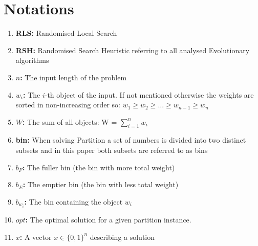 \section{Notations}
\begin{enumerate}
    \item \textbf{RLS:} Randomised Local Search
    \item \textbf{RSH:} Randomised Search Heuristic referring to all analysed Evolutionary algorithms
    \item \textbf{$n$:} The input length of the problem
    \item \textbf{$w_i$:} The $i$-th object of the input. If not mentioned otherwise the weights are sorted in non-increasing order so: \(w_1 \ge w_2 \ge \ldots \ge w_{n-1} \ge w_{n}\)
    \item \textbf{$W$:} The sum of all objects: W = $\sum_{i=1}^{n}w_i$
    \item \textbf{bin:} When solving Partition a set of numbers is divided into two distinct subsets and in this paper both subsets are referred to as bins
    \item \textbf{$b_F$:} The fuller bin (the bin with more total weight)
    \item \textbf{$b_E$:} The emptier bin (the bin with less total weight)
    \item \textbf{$b_{w_i}$:} The bin containing the object $w_i$
    \item \textbf{$opt$:} The optimal solution for a given partition instance.
    \item \textbf{$x$:} A vector $x \in {\{0, 1\}}^n$ describing a solution
\end{enumerate}